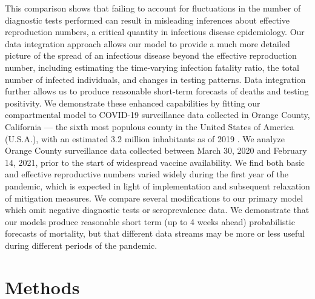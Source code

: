 This comparison shows that failing to account for fluctuations in the number of diagnostic tests performed can result in misleading inferences about effective reproduction numbers, a critical quantity in infectious disease epidemiology.
Our data integration approach allows our model to provide a much more detailed picture of the spread of an infectious disease beyond the effective reproduction number, including estimating the time-varying infection fatality ratio, the total number of infected individuals, and changes in testing patterns.
Data integration further allows us to produce reasonable short-term forecasts of deaths and testing positivity.
We demonstrate these enhanced capabilities
by fitting our compartmental model to COVID-19 surveillance data collected in Orange County, California --- the sixth most populous county in the United States of America (U.S.A.), with an estimated 3.2 million inhabitants as of 2019 \citep{orangecensus}.
We analyze Orange County surveillance data collected between March 30, 2020 and February 14, 2021, prior to the start of widespread vaccine availability.
We find both basic and effective reproductive numbers varied widely during the first year of the pandemic, which is expected in light of implementation and subsequent relaxation of mitigation measures.
We compare several modifications to our primary model which omit negative diagnostic tests or seroprevalence data.
We demonstrate that our models produce reasonable short term (up to 4 weeks ahead) probabilistic forecasts of mortality, but that different data streams may be more or less useful during different periods of the pandemic.

\section{Methods}
\label{ch_4:sec:methods}

